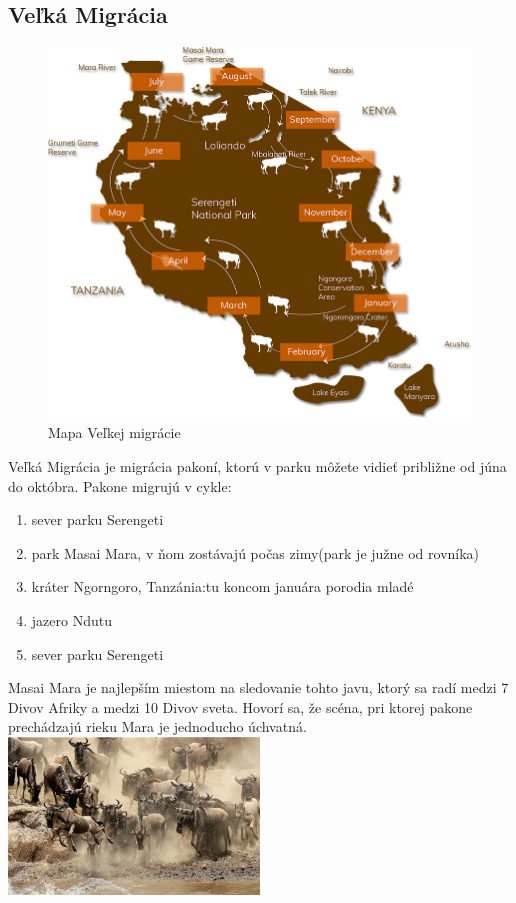 \documentclass{article}
\begin{document}
\subsection{Veľká Migrácia}
\label{sec:gmwildebe}
\begin{figure}[h]
\includegraphics[scale=0.2]{map.png}
\caption{Mapa Veľkej migrácie}
\end{figure}
Veľká Migrácia je migrácia pakoní, ktorú v parku môžete vidieť približne od júna do októbra.
Pakone migrujú v cykle:
\begin{enumerate}
\item sever parku Serengeti
\item park Masai Mara, v ňom zostávajú počas zimy(park je južne od rovníka)
\item kráter Ngorngoro, Tanzánia:tu koncom januára porodia mladé
\item jazero Ndutu
\item sever parku Serengeti
\end{enumerate}
Masai Mara je najlepším miestom na sledovanie tohto javu, ktorý sa radí medzi 7 Divov Afriky a medzi 10 Divov sveta.
Hovorí sa, že scéna, pri ktorej pakone prechádzajú rieku Mara je jednoducho úchvatná.
\vskip 2cm
\includegraphics[width=0.5\textwidth,natwidth=200,natheight=200]{pakone-mara.jpg}\\
\end{document}

